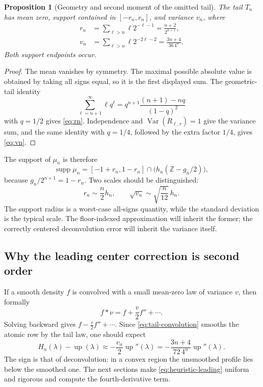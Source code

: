 \documentclass[11pt,oneside]{article}
\newtheorem{proposition}[theorem]{Proposition}
\theoremstyle{definition}
\theoremstyle{remark}
\newcommand{\Z}{\mathbb Z}
\newcommand{\Up}{\operatorname{up}}
\newcommand{\Var}{\operatorname{Var}}
\newcommand{\supp}{\operatorname{supp}}
\begin{document}
\begin{proposition}[Geometry and second moment of the omitted tail]
\label{prop:tail-moments}
The tail $T_n$ has mean zero, support contained in $[-r_n,r_n]$, and variance $v_n$, where
\begin{align}
 r_n&=\sum_{\ell>n}\ell2^{-\ell-1}
     =\frac{n+2}{2^{n+1}},                                  \label{eq:rn}\\
 v_n&=\sum_{\ell>n}\ell2^{-2\ell-2}
     =\frac{3n+4}{36\,4^n}.                                 \label{eq:vn}
\end{align}
Both support endpoints occur.
\end{proposition}

\begin{proof}
The mean vanishes by symmetry.  The maximal possible absolute value is obtained by taking
all signs equal, so it is the first displayed sum.  The geometric-tail identity
\[
 \sum_{\ell=n+1}^{\infty}\ell q^\ell
 =q^{n+1}\frac{(n+1)-nq}{(1-q)^2}
\]
with $q=1/2$ gives \eqref{eq:rn}.  Independence and $\Var(R_{\ell,r})=1$ give the variance
sum, and the same identity with $q=1/4$, followed by the extra factor $1/4$, gives
\eqref{eq:vn}.
\end{proof}

The support of $\mu_n$ is therefore
\begin{equation}
 \supp\mu_n=[-1+r_n,1-r_n]\cap\bigl(h_n(\Z-g_n/2)\bigr),  \label{eq:support-mun}
\end{equation}
because $g_n/2^{n+1}=1-r_n$.  Two scales should be distinguished:
\begin{equation}
 r_n\sim\frac n2h_n,
 \qquad
 \sqrt{v_n}\sim\sqrt{\frac n{12}}\,h_n.                  \label{eq:two-tail-scales}
\end{equation}
The support radius is a worst-case all-signs quantity, while the standard deviation is the
typical scale.  The floor-indexed approximation will inherit the former; the correctly
centered deconvolution error will inherit the variance itself.

\subsection{Why the leading center correction is second order}

If a smooth density $f$ is convolved with a small mean-zero law of variance $v$, then formally
\[
 f*\nu=f+\frac v2f''+\cdots.
\]
Solving backward gives $f-\frac v2f''+\cdots$.  Since \eqref{eq:tail-convolution} smooths the
atomic row by the tail law, one should expect
\begin{equation}
 H_n(\lambda)-\Up(\lambda)
 \approx-\frac{v_n}{2}\Up''(\lambda)
 =-\frac{3n+4}{72\,4^n}\Up''(\lambda).                    \label{eq:heuristic-leading}
\end{equation}
The sign is that of deconvolution: in a convex region the unsmoothed profile lies below the
smoothed one.  The next sections make \eqref{eq:heuristic-leading} uniform and rigorous and
compute the fourth-derivative term.
\end{document}

